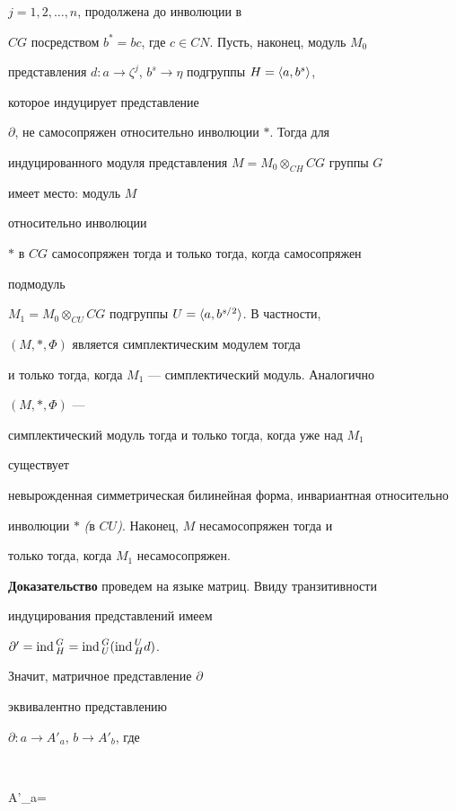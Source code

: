 \begin{thm}
$j=1,2,\dotsc,n$, продолжена до инволюции в


$CG$ посредством $b^*=bc$, где $c\in CN$. Пусть, наконец, модуль $M_0$


представления $d:a\to\zeta^j$, $b^s\to\eta$ подгруппы $H=\langle a,b^s\rangle$,


которое индуцирует представление


$\partial$, не самосопряжен относительно инволюции $*$. Тогда для


индуцированного модуля представления $M=M_0\otimes_{CH}CG$ группы $G$


имеет место: модуль $M$


относительно инволюции


$*$ в $CG$ самосопряжен тогда и только тогда, когда самосопряжен


подмодуль


$M_1=M_0\otimes_{CU}CG$ подгруппы $U=\langle a,b^{s/2}\rangle$. В частности,


$(M,*,\Phi)$ является симплектическим модулем тогда


и только тогда, когда $M_1$ --- симплектический модуль. Аналогично


$(M,*,\Phi)$ ---


симплектический модуль тогда и только тогда, когда уже над $M_1$


существует


невырожденная симметрическая билинейная форма, инвариантная относительно


инволюции $*$ {\em (}в $CU${\em )}. Наконец, $M$ несамосопряжен тогда и


только тогда, когда $M_1$ несамосопряжен.


\end{thm}





{\bf Доказательство} проведем на языке матриц. Ввиду транзитивности


индуцирования представлений имеем


$\partial'=\text{ind\,}^G_H=\text{ind\,}^G_U(\text{ind\,}^U_Hd)$.


Значит, матричное представление $\partial$


эквивалентно представлению


$\partial:a\to A'_a$, $b\to A'_b$, где


$$


A'_a=


